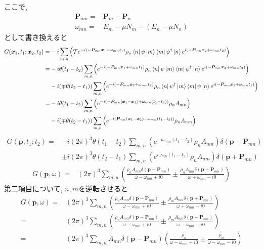 \documentclass[platex, a4j, 9pt, dvipdfmx]{jsarticle}
\begin{document}
ここで,
\begin{align}
    \bm{P}_{mn} =& \bm{P}_m-\bm{P}_n \nonumber\\
    \omega_{mn} =& E_m-\mu N_m - (E_n-\mu N_n) \tag{3.16}
\end{align}
として書き換えると
\begin{align}
    G(\bm{x}_1,t_1;\bm{x}_2,t_2) =& -i\sum_{m,n}\left(\mathcal{T}e^{-i(-\bm{P}_{mn}\bm{x}_1+\omega_{mn}t_1)}\rho_n\bra{n}\psi\ket{m}\bra{m}\psi^{\dagger}\ket{n}e^{i(-\bm{P}_{mn}\bm{x}_2+\omega_{mn}t_2)}\right)\\
    =& -i\theta(t_1-t_2)\sum_{m,n}\left(e^{-i(-\bm{P}_{mn}\bm{x}_1+\omega_{mn}t_1)}\rho_n\bra{n}\psi\ket{m}\bra{m}\psi^{\dagger}\ket{n}e^{i(-\bm{P}_{mn}\bm{x}_2+\omega_{mn}t_2)}\right)\nonumber\\
    & -i(\mp\theta(t_2-t_1))\sum_{m,n}\left(e^{-i(-\bm{P}_{mn}\bm{x}_2+\omega_{mn}t_2)}\rho_n\bra{n}\psi^{\dagger}\ket{m}\bra{m}\psi\ket{n}e^{i(-\bm{P}_{mn}\bm{x}_1+\omega_{mn}t_1)}\right)\\
    =& -i\theta(t_1-t_2)\sum_{m,n}\left(e^{-i(-\bm{P}_{mn}(\bm{x}_1-\bm{x}_2)+\omega_{mn}(t_1-t_2))}\rho_nA_{mn}\right)\nonumber\\
    & -i(\mp\theta(t_2-t_1))\sum_{m,n}\left(e^{-i(\bm{P}_{mn}(\bm{x}_1-\bm{x}_2)-\omega_{mn}(t_1-t_2))}\rho_nA_{nm}\right)
\end{align}
\begin{align}
    G(\bm{p},t_1;t_2) =& -i(2\pi)^3\theta(t_1-t_2)\sum_{m,n}\left(e^{-i\omega_{mn}(t_1-t_2)}\rho_nA_{mn}\right)\delta(\bm{p}-\bm{P}_{mn})\nonumber\\
    & \pm i(2\pi)^3\theta(t_2-t_1)\sum_{m,n}\left(e^{i\omega_{mn}(t_1-t_2)}\rho_nA_{nm}\right)\delta(\bm{p}+\bm{P}_{mn})
\end{align}
\begin{align}
    G(\bm{p},\omega) =& (2\pi)^3\sum_{m,n}\left(\frac{\rho_nA_{mn}\delta(\bm{p}-\bm{P}_{mn})}{\omega-\omega_{mn}+i0}\pm\frac{\rho_nA_{nm}\delta(\bm{p}+\bm{P}_{mn})}{\omega+\omega_{mn}-i0}\right)
\end{align}
第二項目について, $n,m$を逆転させると
\begin{align}
    G(\bm{p},\omega) =& (2\pi)^3\sum_{m,n}\left(\frac{\rho_nA_{mn}\delta(\bm{p}-\bm{P}_{mn})}{\omega-\omega_{mn}+i0}\pm\frac{\rho_mA_{mn}\delta(\bm{p}+\bm{P}_{nm})}{\omega+\omega_{nm}-i0}\right)\\
    =& (2\pi)^3\sum_{m,n}\left(\frac{\rho_nA_{mn}\delta(\bm{p}-\bm{P}_{mn})}{\omega-\omega_{mn}+i0}\pm\frac{\rho_mA_{mn}\delta(\bm{p}-\bm{P}_{mn})}{\omega-\omega_{mn}-i0}\right)\\
    =& (2\pi)^3\sum_{m,n}A_{mn}\delta(\bm{p}-\bm{P}_{mn})\left(\frac{\rho_n}{\omega-\omega_{mn}+i0}\pm\frac{\rho_m}{\omega-\omega_{mn}-i0}\right)
\end{align}
\end{document}

